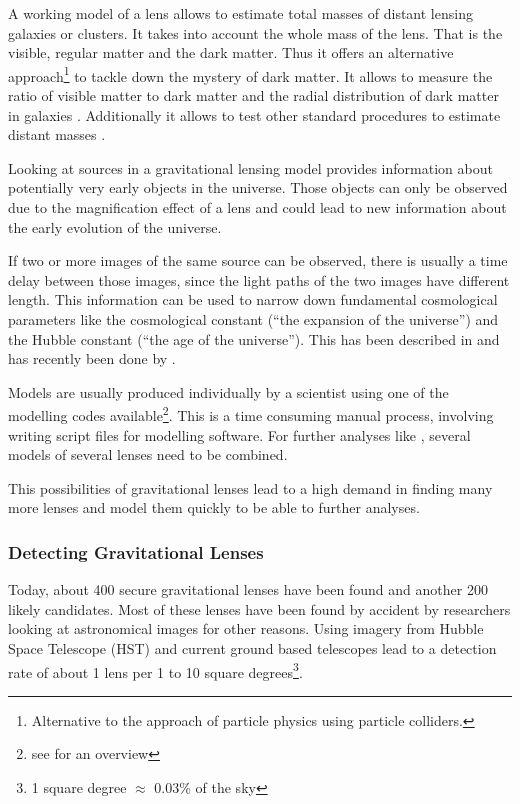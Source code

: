 \documentclass[11pt]{article}
\begin{document}

A working model of a lens allows to estimate total masses of distant lensing galaxies or clusters.
It takes into account the whole mass of the lens.
That is the visible, regular matter and the dark matter\cite{kochanek1995there}.
Thus it offers an alternative approach\footnote{Alternative to the approach of particle physics using particle colliders.} to tackle down the mystery of dark matter.
It allows to measure the ratio of visible matter to dark matter and the radial distribution of dark matter in galaxies \cite{treukoop04}.
Additionally it allows to test other standard procedures to estimate distant masses \cite{kochanek1995there}.

Looking at sources in a gravitational lensing model provides information about potentially very early objects in the universe.
Those objects can only be observed due to the magnification effect of a lens and could lead to new information about the early evolution of the universe\cite{rusin03}.

If two or more images of the same source can be observed, there is usually a time delay between those images, since the light paths of the two images have different length.
This information can be used to narrow down fundamental cosmological parameters like the cosmological constant (``the expansion of the universe'') and the Hubble constant (``the age of the universe'').
This has been described in \cite{refsdal1964} and has recently been done by \cite{age_uni}.


Models are usually produced individually by a scientist using one of the modelling codes available\footnote{see \cite{overview_soft2013} for an overview}.
This is a time consuming manual process, involving writing script files for modelling software.
For further analyses like \cite{age_uni}, several models of several lenses need to be combined.

This possibilities of gravitational lenses lead to a high demand in finding many more lenses and model them quickly to be able to further analyses.



\subsubsection{Detecting Gravitational Lenses}

Today, about 400 secure gravitational lenses have been found and another 200 likely candidates.
Most of these lenses have been found by accident by researchers looking at astronomical images for other reasons.
Using imagery from Hubble Space Telescope (HST) and current ground based telescopes lead to a detection rate of about 1 lens per 1 to 10 square degrees\footnote{1 square degree $\approx$ 0.03\% of the sky}.
\end{document}
